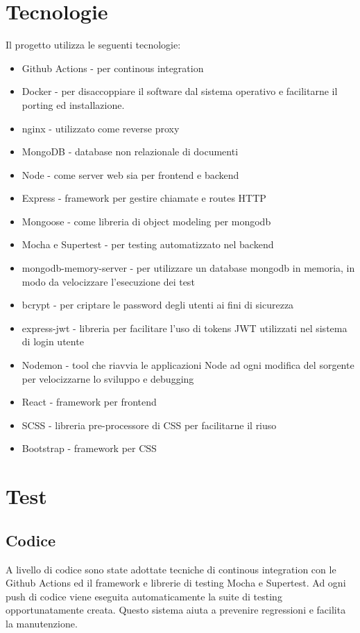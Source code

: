 \documentclass{report}
\begin{document}
\section{Tecnologie}
Il progetto utilizza le seguenti tecnologie:
\begin{itemize}
    \item Github Actions - per continous integration
    \item Docker - per disaccoppiare il software dal sistema operativo e facilitarne il porting ed installazione.
    \item nginx - utilizzato come reverse proxy
    \item MongoDB - database non relazionale di documenti
    \item Node - come server web sia per frontend e backend
    \item Express - framework per gestire chiamate e routes HTTP
    \item Mongoose - come libreria di object modeling per mongodb
    \item Mocha e Supertest - per testing automatizzato nel backend
    \item mongodb-memory-server - per utilizzare un database mongodb in memoria, in modo da velocizzare l'esecuzione dei test
    \item bcrypt - per criptare le password degli utenti ai fini di sicurezza
    \item express-jwt - libreria per facilitare l'uso di tokens JWT utilizzati nel sistema di login utente
    \item Nodemon - tool che riavvia le applicazioni Node ad ogni modifica del sorgente
    per velocizzarne lo sviluppo e debugging
    \item React - framework per frontend
    \item SCSS - libreria pre-processore di CSS per facilitarne il riuso
    \item Bootstrap - framework per CSS
\end{itemize}


\section{Test}
\subsection{Codice}
A livello di codice sono state adottate tecniche di continous integration con le Github Actions ed il framework e librerie di testing
Mocha e Supertest.
Ad ogni push di codice viene eseguita automaticamente la suite di testing opportunatamente creata.
Questo sistema aiuta a prevenire regressioni e facilita la manutenzione.
\end{document}

